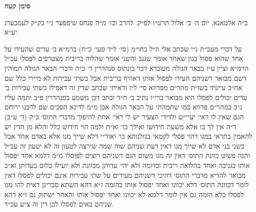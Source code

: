 \documentclass[12pt, openany]{book}
\newcommand{\chapname}{}
\newcommand{\newchap}[1]{
	\addcontentsline{toc}{chapter}{#1}
	\renewcommand{\chapname}{#1}
		\begin{center}
			\textbf{%
\fontsize{16pt}{16pt}\selectfont
				#1}
		\end{center}
}
\begin{document}
\newchap{סימן קעח}
\begin{multicols}{2}
ב״ה אלטאנא, יום ה׳ ב׳ אלול תרט״ו לפ״ק. להרב וכו׳ מ״ה פנחס שיפפער נ״י בק״ק לעמבערג יע״א.\\\vspace{0pt}

על דברי מעכ״ת נ״י שכתב אלי וז״ל בחו״מ (סי׳ ל״ד סעי׳ כ״ח) ברמ״א ב׳ עדים שהעידו על אחד שהוא פסול כגון שאחד אומר שגנב והשני אומר שהלוה בריבית מצטרפים לפסלו עכ״ל הרמ״א וציין ע״ז בבאר הגולה מעובדא דבר בונתוס סנהדרין ד׳ כ״ה ודברי הבאר הגולה תמוהין דשם מבואר דשניהם העידו לפסול אותו דאוזיף בריבית אבל בשתי עבירות לא מיירי כלל שם אח״כ עיינתי בשו״ת מהר״ם מפדווא סי׳ ל״ז וראיתי שכתב שדין זה דאפילו בשתי עבירות ב׳ עדים יכולים לפסלו הוא מבואר ברי״ו נתיב ב׳ ח״ד וכתב דכן משמע בסנהדרין פ״ב ותמה עליו ג״כ במהר״ם פדווא כמו שתמהתי על הבאר הגולה אכן מ״מ לדינא הסכים שם לרבנו ירוחם הגם שאין לו ראי׳ יעיי״ש ולדידי הצעיר יש לי ראי׳ אחת להיפוך מדברי התוס׳ ב״ק (ד׳ ע״ב) ד״ה אין לך בו אלא משעת חידושו ואילך כו׳ וא״ת ולמה הוי חידוש כלל והלא מן הדין יש להאמין בתראי במגו דהוי פסלי לקמאי בגזלנותא כו׳ ואור״י דלא שייך מגו אלא באדם אחד אבל בשני בני אדם לא שייך מגו דאין דעת שניהם שוה שמה שירצה לטעון זה לא יטעון זה עכ״ל והנה פשוט כוונת התוס׳ דאין זה מגו משום הגם דשניהם רוצים לפוסלו מ״מ דלמא אחד יפסול אותו בגניבה ואחד בהלואת ריבית וכדומה ולא יהי׳ עדותן מכוונת ולא יועילו כלום בעדותן וא״כ מבואר להדיא מדברי התוס׳ דהיכי דשניהם מעידים על שתי עבירות אינם יכולים לפסלו דאין לומר דכוונת התוס׳ דלא יכוונו ואחד יפסול אותו בהזמה ז״א דהא השתא סברינן דאית להו מגו לפסלו בלא הזמה גם אין לומר דלמא לא יכוונו ואחד יפסול אותו והאחר ישתוק גם ז״א דהא שניהם באים לפסלו לכן דין זה צ״ע עכ״ד.\\\vspace{0pt}


\end{multicols}
\end{document}
